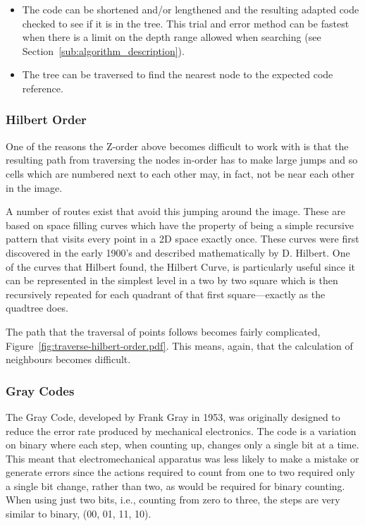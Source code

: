 \begin{itemize}
	\item The code can be shortened and/or lengthened and the resulting adapted
		code checked to see if it is in the tree. This trial and error method
		can be fastest when there is a limit on the depth range allowed when
		searching (see Section~\ref{sub:algorithm_description}).
	\item The tree can be traversed to find the nearest node to the expected
		code reference.
\end{itemize}

\subsubsection{Hilbert Order}
\label{ssub:hilbert_order}

One of the reasons the Z-order above becomes difficult to work with is that
the resulting path from traversing the nodes in-order has to make large jumps
and so cells which are numbered next to each other may, in fact, not be near
each other in the image.

A number of routes exist that avoid this jumping around the image. These are
based on space filling curves which have the property of being a simple
recursive pattern that visits every point in a 2D space exactly once. These
curves were first discovered in the early 1900's and described mathematically
by D. Hilbert\cite{hilbert1970stetige}. One of the curves that Hilbert found,
the Hilbert Curve, is particularly useful since it can be represented in the
simplest level in a two by two square which is then recursively repeated for
each quadrant of that first square---exactly as the quadtree does.

The path that the traversal of points follows becomes fairly complicated,
Figure~\ref{fig:traverse-hilbert-order.pdf}. This means, again, that the
calculation of neighbours becomes difficult.

\subsubsection{Gray Codes}
\label{ssub:gray_codes}

The Gray Code\cite{gray1953pulse}, developed by Frank Gray in 1953, was
originally designed to reduce the error rate produced by mechanical
electronics. The code is a variation on binary where each step, when counting
up, changes only a single bit at a time. This meant that electromechanical
apparatus was less likely to make a mistake or generate errors since the
actions required to count from one to two required only a single bit change,
rather than two, as would be required for binary counting. When using just two
bits, i.e., counting from zero to three, the steps are very similar to binary,
(00, 01, 11, 10).


